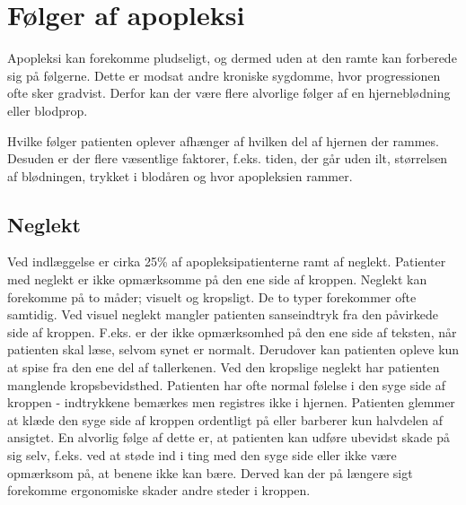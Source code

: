 \section{Følger af apopleksi }
Apopleksi kan forekomme pludseligt, og dermed uden at den ramte kan forberede sig på følgerne. Dette er modsat andre kroniske sygdomme, hvor progressionen ofte sker gradvist. Derfor kan der være flere alvorlige følger af en hjerneblødning eller blodprop. \citep{Muus2008}


Hvilke følger patienten oplever afhænger af hvilken del af hjernen der rammes. Desuden er der flere væsentlige faktorer, f.eks. tiden, der går uden ilt, størrelsen af blødningen, trykket i blodåren og hvor apopleksien rammer.\citep{Michael-Titus2010}

\subsection{Neglekt}
Ved indlæggelse er cirka 25\% af apopleksipatienterne ramt af neglekt.
Patienter med neglekt er ikke opmærksomme på den ene side af kroppen. Neglekt kan forekomme på to måder; visuelt og kropsligt. De to typer forekommer ofte samtidig. Ved visuel neglekt mangler patienten sanseindtryk fra den påvirkede side af kroppen. F.eks. er der ikke opmærksomhed på den ene side af teksten, når patienten skal læse, selvom synet er normalt. Derudover kan patienten opleve kun at spise fra den ene del af tallerkenen. Ved den kropslige neglekt har patienten manglende kropsbevidsthed. Patienten har ofte normal følelse i den syge side af kroppen - indtrykkene bemærkes men registres ikke i hjernen. Patienten glemmer at klæde den syge side af kroppen ordentligt på eller barberer kun halvdelen af ansigtet. En alvorlig følge af dette er, at patienten kan udføre ubevidst skade på sig selv, f.eks. ved at støde ind i ting med den syge side eller ikke være opmærksom på, at benene ikke kan bære. Derved kan der på længere sigt forekomme ergonomiske skader andre steder i kroppen. \citep{Sundhed.dk}

